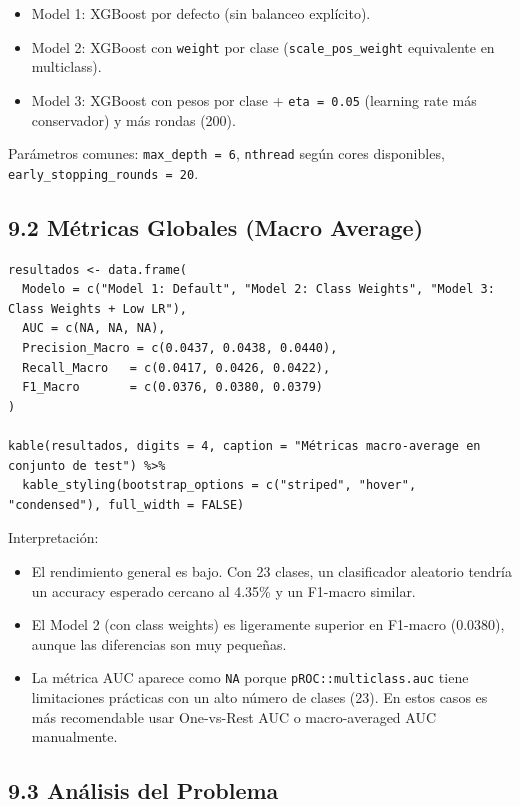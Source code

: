 \documentclass[
]{article}
\providecommand{\tightlist}{%
  \setlength{\itemsep}{0pt}\setlength{\parskip}{0pt}}
\begin{document}
\begin{itemize}
\tightlist
\item
  Model 1: XGBoost por defecto (sin balanceo explícito).
\item
  Model 2: XGBoost con \texttt{weight} por clase
  (\texttt{scale\_pos\_weight} equivalente en multiclass).
\item
  Model 3: XGBoost con pesos por clase + \texttt{eta\ =\ 0.05} (learning
  rate más conservador) y más rondas (200).
\end{itemize}

Parámetros comunes: \texttt{max\_depth\ =\ 6}, \texttt{nthread} según
cores disponibles, \texttt{early\_stopping\_rounds\ =\ 20}.

\subsection{9.2 Métricas Globales (Macro
Average)}\label{muxe9tricas-globales-macro-average}

\begin{verbatim}
resultados <- data.frame(
  Modelo = c("Model 1: Default", "Model 2: Class Weights", "Model 3: Class Weights + Low LR"),
  AUC = c(NA, NA, NA),
  Precision_Macro = c(0.0437, 0.0438, 0.0440),
  Recall_Macro   = c(0.0417, 0.0426, 0.0422),
  F1_Macro       = c(0.0376, 0.0380, 0.0379)
)

kable(resultados, digits = 4, caption = "Métricas macro-average en conjunto de test") %>%
  kable_styling(bootstrap_options = c("striped", "hover", "condensed"), full_width = FALSE)
\end{verbatim}

Interpretación:

\begin{itemize}
\tightlist
\item
  El rendimiento general es bajo. Con 23 clases, un clasificador
  aleatorio tendría un accuracy esperado cercano al 4.35\% y un F1-macro
  similar.
\item
  El Model 2 (con class weights) es ligeramente superior en F1-macro
  (0.0380), aunque las diferencias son muy pequeñas.
\item
  La métrica AUC aparece como \texttt{NA} porque
  \texttt{pROC::multiclass.auc} tiene limitaciones prácticas con un alto
  número de clases (23). En estos casos es más recomendable usar
  One-vs-Rest AUC o macro-averaged AUC manualmente.
\end{itemize}

\subsection{9.3 Análisis del Problema}\label{anuxe1lisis-del-problema}
\end{document}
